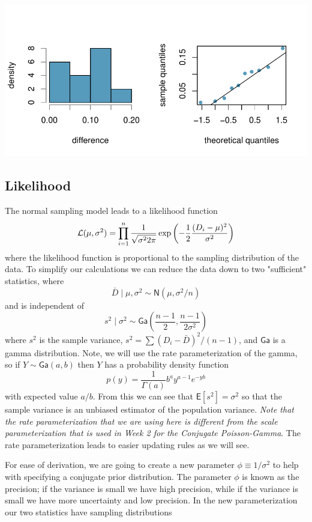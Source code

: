 \documentclass[11pt]{article}
\def\No{\textsf{N}}
\def\Ga{\textsf{Ga}}
\newcommand{\E}{\textsf{E}}
\begin{document}
\includegraphics{4-3-2-pair-notes-hist}

\subsection*{Likelihood}
The normal sampling model leads to a likelihood function 
\begin{equation}
{\cal{L}}(\mu, \sigma^2) = \prod_{i = 1}^{n} \frac{1}{\sqrt{\sigma^2 2 \pi}} \exp{\left( - \frac{1}{2}\frac{(D_i - \mu)^2}{\sigma^2} \right)} 
\label{eq:lik}
\end{equation}
where the likelihood function is proportional to the sampling distribution of the data.
To simplify our calculations we can reduce the data down to two "sufficient" statistics, where
$$ \bar{D} \mid \mu, \sigma^2 \sim \No(\mu,  \sigma^2/n)$$
and is independent of 
$$ 
s^2 \mid \sigma^2 \sim  \Ga\left(\frac{n - 1}{2},  \frac{n-1}{2 \sigma^2}\right)
$$
where $s^2$ is the sample variance, $s^2 = \sum(D_i - \bar{D})^2/(n-1)$, and $\Ga$ is a gamma distribution.  Note, we will use the rate parameterization of the gamma, so if $Y \sim \Ga(a, b)$ then $Y$ has a probability density function 
$$
p(y) = \frac{1}{\Gamma(a)} b^a y^{a - 1} e^{- y b} 
$$
with expected value $a/b$.  From this we can see that $\E[s^2] = \sigma^2$ so that the sample variance is an unbiased estimator of the population variance. {\it Note that the rate parameterization that we are using here is different from the scale parameterization that is used in Week 2 for the Conjugate Poisson-Gamma}.  The rate parameterization leads to easier updating rules as we will see.   


For ease of derivation, we are going to create a new parameter $\phi \equiv 1/\sigma^2$ to help with specifying a conjugate prior distribution.  The parameter $\phi$ is known as the precision;  if the variance is small we have high precision, while if the variance is small we have more uncertainty  and low precision.  In the new parameterization our two statistics have sampling distributions
\end{document}
